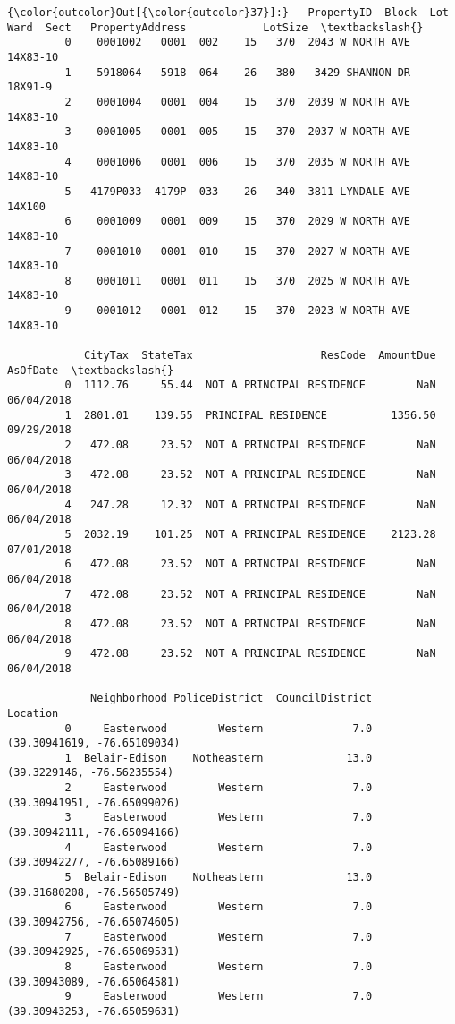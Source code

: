\documentclass[11pt]{article}
\begin{document}
\begin{Verbatim}[commandchars=\\\{\}]
{\color{outcolor}Out[{\color{outcolor}37}]:}   PropertyID  Block  Lot  Ward  Sect   PropertyAddress            LotSize  \textbackslash{}
         0    0001002   0001  002    15   370  2043 W NORTH AVE  14X83-10            
         1    5918064   5918  064    26   380   3429 SHANNON DR  18X91-9             
         2    0001004   0001  004    15   370  2039 W NORTH AVE  14X83-10            
         3    0001005   0001  005    15   370  2037 W NORTH AVE  14X83-10            
         4    0001006   0001  006    15   370  2035 W NORTH AVE  14X83-10            
         5   4179P033  4179P  033    26   340  3811 LYNDALE AVE  14X100              
         6    0001009   0001  009    15   370  2029 W NORTH AVE  14X83-10            
         7    0001010   0001  010    15   370  2027 W NORTH AVE  14X83-10            
         8    0001011   0001  011    15   370  2025 W NORTH AVE  14X83-10            
         9    0001012   0001  012    15   370  2023 W NORTH AVE  14X83-10            
         
            CityTax  StateTax                    ResCode  AmountDue    AsOfDate  \textbackslash{}
         0  1112.76     55.44  NOT A PRINCIPAL RESIDENCE        NaN  06/04/2018   
         1  2801.01    139.55  PRINCIPAL RESIDENCE          1356.50  09/29/2018   
         2   472.08     23.52  NOT A PRINCIPAL RESIDENCE        NaN  06/04/2018   
         3   472.08     23.52  NOT A PRINCIPAL RESIDENCE        NaN  06/04/2018   
         4   247.28     12.32  NOT A PRINCIPAL RESIDENCE        NaN  06/04/2018   
         5  2032.19    101.25  NOT A PRINCIPAL RESIDENCE    2123.28  07/01/2018   
         6   472.08     23.52  NOT A PRINCIPAL RESIDENCE        NaN  06/04/2018   
         7   472.08     23.52  NOT A PRINCIPAL RESIDENCE        NaN  06/04/2018   
         8   472.08     23.52  NOT A PRINCIPAL RESIDENCE        NaN  06/04/2018   
         9   472.08     23.52  NOT A PRINCIPAL RESIDENCE        NaN  06/04/2018   
         
             Neighborhood PoliceDistrict  CouncilDistrict                     Location  
         0     Easterwood        Western              7.0  (39.30941619, -76.65109034)  
         1  Belair-Edison    Notheastern             13.0   (39.3229146, -76.56235554)  
         2     Easterwood        Western              7.0  (39.30941951, -76.65099026)  
         3     Easterwood        Western              7.0  (39.30942111, -76.65094166)  
         4     Easterwood        Western              7.0  (39.30942277, -76.65089166)  
         5  Belair-Edison    Notheastern             13.0  (39.31680208, -76.56505749)  
         6     Easterwood        Western              7.0  (39.30942756, -76.65074605)  
         7     Easterwood        Western              7.0  (39.30942925, -76.65069531)  
         8     Easterwood        Western              7.0  (39.30943089, -76.65064581)  
         9     Easterwood        Western              7.0  (39.30943253, -76.65059631)  
\end{Verbatim}
            
\end{document}
